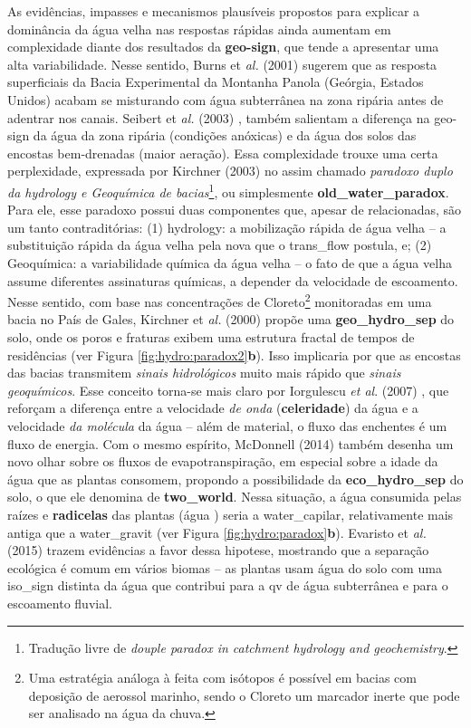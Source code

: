 \documentclass[./main.tex]{subfiles}
\begin{document}
\par As evidências, impasses e mecanismos plausíveis propostos para explicar a dominância da água velha nas respostas rápidas ainda aumentam em complexidade diante dos resultados da \textbf{\gls{geo-sign}}, que tende a apresentar uma alta variabilidade. Nesse sentido, Burns et \textit{al.} (2001) \cite{burns2001quantifying} sugerem que as resposta superficiais da Bacia Experimental da Montanha Panola (Geórgia, Estados Unidos) acabam se misturando com água subterrânea na zona ripária antes de adentrar nos canais. Seibert et \textit{al.} (2003) \cite{seibert2003groundwater}, também salientam a diferença na \gls{geo-sign} da água da zona ripária (condições anóxicas) e da água dos solos das encostas bem-drenadas (maior aeração). Essa complexidade trouxe uma certa perplexidade, expressada por Kirchner (2003) \cite{Kirchner2003} no assim chamado \textit{paradoxo duplo da \gls{hydrology} e Geoquímica de bacias}\footnote{Tradução livre de \textit{douple paradox in catchment hydrology and geochemistry}.}, ou simplesmente \textbf{\gls{old_water_paradox}}. Para ele, esse paradoxo possui duas componentes que, apesar de relacionadas, são um tanto contraditórias: (1) \gls{hydrology}: a mobilização rápida de água velha -- a substituição rápida da água velha pela nova que o \gls{trans_flow} postula, e; (2) Geoquímica: a variabilidade química da água velha -- o fato de que a água velha assume diferentes assinaturas químicas, a depender da velocidade de escoamento. Nesse sentido, com base nas concentrações de Cloreto\footnote{Uma estratégia análoga à feita com isótopos é possível em bacias com deposição de aerossol marinho, sendo o Cloreto um marcador inerte que pode ser analisado na água da chuva.} monitoradas em uma bacia no País de Gales, Kirchner et \textit{al.} (2000) \cite{kirchner2000} propõe uma \textbf{\gls{geo_hydro_sep}} do solo, onde os poros e fraturas exibem uma estrutura fractal de tempos de residências (ver Figura \ref{fig:hydro:paradox2}\textbf{b}). Isso implicaria por que as encostas das bacias transmitem \textit{sinais hidrológicos} muito mais rápido que \textit{sinais geoquímicos}. Esse conceito torna-se mais claro por Iorgulescu \textit{et al}. (2007) \cite{Iorgulescu2007}, que reforçam a diferença entre a velocidade \textit{de onda} (\textbf{celeridade}) da água e a velocidade \textit{da molécula} da água -- além de material, o fluxo das enchentes é um fluxo de energia. Com o mesmo espírito, McDonnell (2014) \cite{mcdonnell2014} também desenha um novo olhar sobre os fluxos de evapotranspiração, em especial sobre a idade da água que as plantas consomem, propondo a possibilidade da \textbf{\gls{eco_hydro_sep}} do solo, o que ele denomina de \textbf{\gls{two_world}}. Nessa situação, a água consumida pelas raízes e \textbf{radicelas} das plantas (água ) seria a \gls{water_capilar}, relativamente mais antiga que a \gls{water_gravit} (ver Figura \ref{fig:hydro:paradox}\textbf{b}). Evaristo et \textit{al.} (2015) \cite{Evaristo2015} trazem evidências a favor dessa \gls{hipotese}, mostrando que a separação ecológica é comum em vários biomas -- as plantas usam água do solo com uma \gls{iso_sign} distinta da água que contribui para a \gls{qv} de água subterrânea e para o escoamento fluvial.
\end{document}
